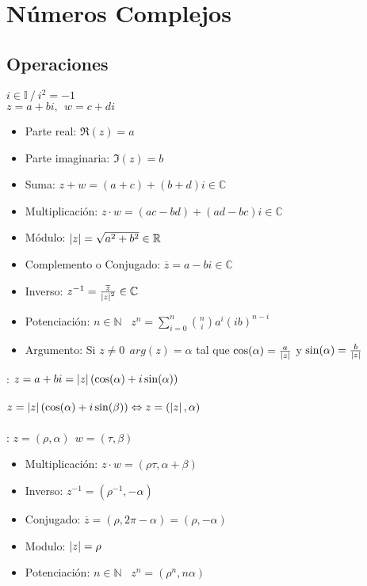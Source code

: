 \documentclass[a4paper,10pt]{article}
\begin{document}
\section{Números Complejos}


\subsection{Operaciones}


 $i \in \mathbb{I} \ / \ i^{2}=-1$ \\

 $z=a+bi, \ \ w=c+di$
\begin{itemize}
	\item Parte real: $\Re(z) = a$
	\item Parte imaginaria: $\Im(z) = b$
	\item Suma: $z+w=(a+c)+(b+d)i \in \mathbb{C}$
	\item Multiplicación: $z \cdot w = (ac - bd) + (ad - bc)i \in \mathbb{C}$
	\item Módulo: $\left\lvert z\right\rvert=\sqrt{a^{2}+b^{2}} \in \mathbb{R}$
	\item Complemento o Conjugado: $\overline{z} = a-bi \in \mathbb{C}$
	\item Inverso: $z^{-1} = \frac{\overline{z}}{{\left\lvert z\right\rvert}^{2}} \in \mathbb{C}$
	\item Potenciación: $n \in \mathbb{N}$ \ $z^{n} = \displaystyle \sum_{i = 0}^{n} {\binom{n}{i} {a}^{i} {(ib)}^{n-i}}$
	\item Argumento: Si $z \neq 0 \ \ arg(z) = \alpha$ tal que $\cos(\alpha)=\frac {a}{\left\lvert z\right\rvert}$ y $\sin(\alpha)=\frac {b}{\left\lvert z\right\rvert}$ 
\end{itemize}


: $z = a + bi = \left\lvert z\right\rvert (\cos(\alpha)+ i \sin (\alpha))$ \\ \\

\notacion $z = \left\lvert z\right\rvert (\cos(\alpha)+ i \sin (\beta)) \Leftrightarrow z=(\left\lvert z\right\rvert,\alpha)$ \\ \\

: $z=(\rho,\alpha) \ \ w=(\tau,\beta)$
\begin{itemize}
	\item Multiplicación: $z \cdot w = (\rho \tau, \alpha + \beta)$
	\item Inverso: $z^{-1} = (\rho^{-1},-\alpha)$
	\item Conjugado: $\overline{z} = (\rho,2\pi - \alpha) = (\rho,-\alpha)$ 
	\item Modulo: $\left\lvert z\right\rvert = \rho$
	\item Potenciación: $n \in \mathbb{N}$ \ $z^{n} = (\rho^{n},n\alpha)$
\end{itemize}
\end{document}
